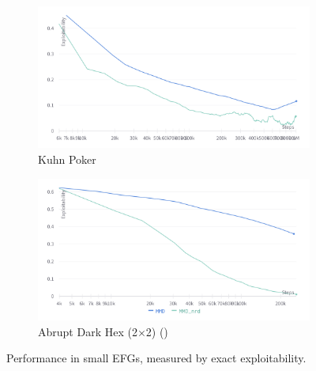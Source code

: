 \begin{figure}[H]
	\centering
	\begin{subfigure}[b]{0.6\textwidth}
		\includegraphics[width=\textwidth]{figs/kpoker.png}
		\caption{Kuhn Poker}
	\end{subfigure}
	\begin{subfigure}[b]{0.6\textwidth}
		\includegraphics[width=\textwidth]{figs/ahex22.png}
		\caption{Abrupt Dark Hex (2$\times$2) ()}
	\end{subfigure}
	\caption{Performance in small EFGs, measured by exact exploitability.}
	\label{fig:neural1}
\end{figure}


